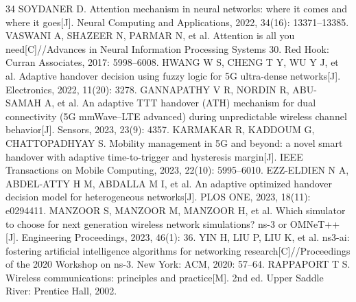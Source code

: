 \documentclass[10pt,a4paper]{article}
\begin{document}
{\begin{thebibliography}{34}
 SOYDANER D. Attention mechanism in neural networks: where it comes and where it goes[J]. Neural Computing and Applications, 2022, 34(16): 13371--13385.
 VASWANI A, SHAZEER N, PARMAR N, et al. Attention is all you need[C]//Advances in Neural Information Processing Systems 30. Red Hook: Curran Associates, 2017: 5998--6008.
 HWANG W S, CHENG T Y, WU Y J, et al. Adaptive handover decision using fuzzy logic for 5G ultra-dense networks[J]. Electronics, 2022, 11(20): 3278.
 GANNAPATHY V R, NORDIN R, ABU-SAMAH A, et al. An adaptive TTT handover (ATH) mechanism for dual connectivity (5G mmWave--LTE advanced) during unpredictable wireless channel behavior[J]. Sensors, 2023, 23(9): 4357.
 KARMAKAR R, KADDOUM G, CHATTOPADHYAY S. Mobility management in 5G and beyond: a novel smart handover with adaptive time-to-trigger and hysteresis margin[J]. IEEE Transactions on Mobile Computing, 2023, 22(10): 5995--6010.
 EZZ-ELDIEN N A, ABDEL-ATTY H M, ABDALLA M I, et al. An adaptive optimized handover decision model for heterogeneous networks[J]. PLOS ONE, 2023, 18(11): e0294411.
 MANZOOR S, MANZOOR M, MANZOOR H, et al. Which simulator to choose for next generation wireless network simulations? ns-3 or OMNeT++[J]. Engineering Proceedings, 2023, 46(1): 36.
 YIN H, LIU P, LIU K, et al. ns3-ai: fostering artificial intelligence algorithms for networking research[C]//Proceedings of the 2020 Workshop on ns-3. New York: ACM, 2020: 57--64.
 RAPPAPORT T S. Wireless communications: principles and practice[M]. 2nd ed. Upper Saddle River: Prentice Hall, 2002.
\end{thebibliography}
}
\end{document}
